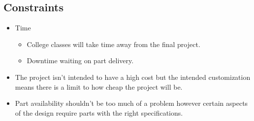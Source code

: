 \subsection{Constraints}
	\begin{itemize}
		\item Time
			\begin{itemize}
			\item College classes will take time away from the final project.
			\item Downtime waiting on part delivery.
			\end{itemize}
		\item The project isn't intended to have a high cost but the intended customization means there is a limit to how cheap the project will be.
		\item Part availability shouldn't be too much of a problem however certain aspects of the design require parts with the right specifications.
	\end{itemize}